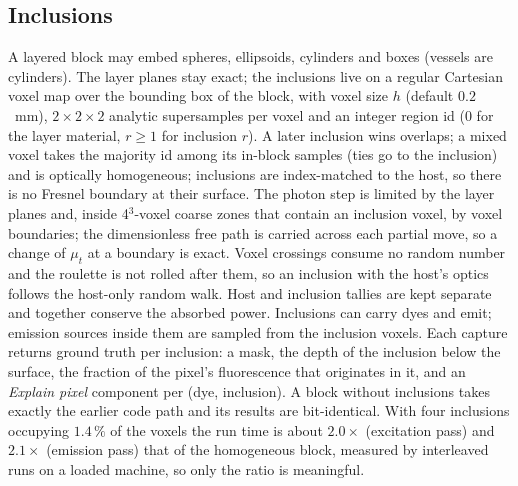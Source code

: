 \documentclass[journal]{IEEEtran}
\newcommand{\mut}{\mu_t}
\begin{document}
\subsection{Inclusions}
\label{sec:inclusions}
A layered block may embed spheres, ellipsoids, cylinders and boxes (vessels are cylinders). The layer planes stay exact; the inclusions live on a regular Cartesian voxel map over the bounding box of the block, with voxel size $h$ (default $0.2$~mm), $2\times2\times2$ analytic supersamples per voxel and an integer region id ($0$ for the layer material, $r\ge1$ for inclusion $r$). A later inclusion wins overlaps; a mixed voxel takes the majority id among its in-block samples (ties go to the inclusion) and is optically homogeneous; inclusions are index-matched to the host, so there is no Fresnel boundary at their surface. The photon step is limited by the layer planes and, inside 4$^3$-voxel coarse zones that contain an inclusion voxel, by voxel boundaries; the dimensionless free path is carried across each partial move, so a change of $\mut$ at a boundary is exact. Voxel crossings consume no random number and the roulette is not rolled after them, so an inclusion with the host's optics follows the host-only random walk. Host and inclusion tallies are kept separate and together conserve the absorbed power. Inclusions can carry dyes and emit; emission sources inside them are sampled from the inclusion voxels. Each capture returns ground truth per inclusion: a mask, the depth of the inclusion below the surface, the fraction of the pixel's fluorescence that originates in it, and an \emph{Explain pixel} component per (dye, inclusion). A block without inclusions takes exactly the earlier code path and its results are bit-identical. With four inclusions occupying $1.4\,\%$ of the voxels the run time is about $2.0\times$ (excitation pass) and $2.1\times$ (emission pass) that of the homogeneous block, measured by interleaved runs on a loaded machine, so only the ratio is meaningful.
\end{document}
